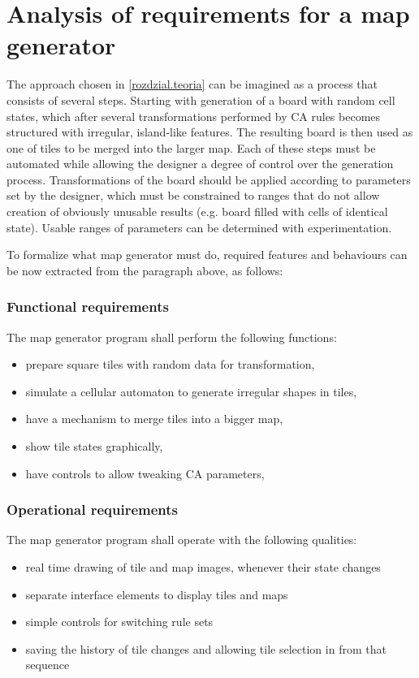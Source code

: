 \documentclass[12pt]{report}
\begin{document}
\section{Analysis of requirements for a map generator}

The approach chosen in \cref{rozdzial.teoria} can be imagined as a process that consists of several steps. Starting with generation of a board with random cell states, which after several transformations performed by CA rules becomes structured with irregular, island-like features. The resulting board is then used as one of tiles to be merged into the larger map. Each of these steps must be automated while allowing the designer a degree of control over the generation process. Transformations of the board should be applied according to parameters set by the designer, which must be constrained to ranges that do not allow creation of obviously unusable results (e.g. board filled with cells of identical state). Usable ranges of parameters can be determined with experimentation. 

To formalize what map generator must do, required features and behaviours can be now extracted from the paragraph above, as follows:
 
\subsubsection{Functional requirements}

The map generator program shall perform the following functions:
\begin{itemize}
	\item prepare square tiles with random data for transformation,
	\item simulate a cellular automaton to generate irregular shapes in tiles,
	\item have a mechanism to merge tiles into a bigger map,
	\item show tile states graphically,
	\item have controls to allow tweaking CA parameters,
\end{itemize} 


\subsubsection{Operational requirements}
The map generator program shall operate with the following qualities:
\begin{itemize}
	\item real time drawing of tile and map images, whenever their state changes  
	\item separate interface elements to display tiles and maps
	\item simple controls for switching rule sets
	\item saving the history of tile changes and allowing tile selection in from that sequence
\end{itemize}
\end{document}

